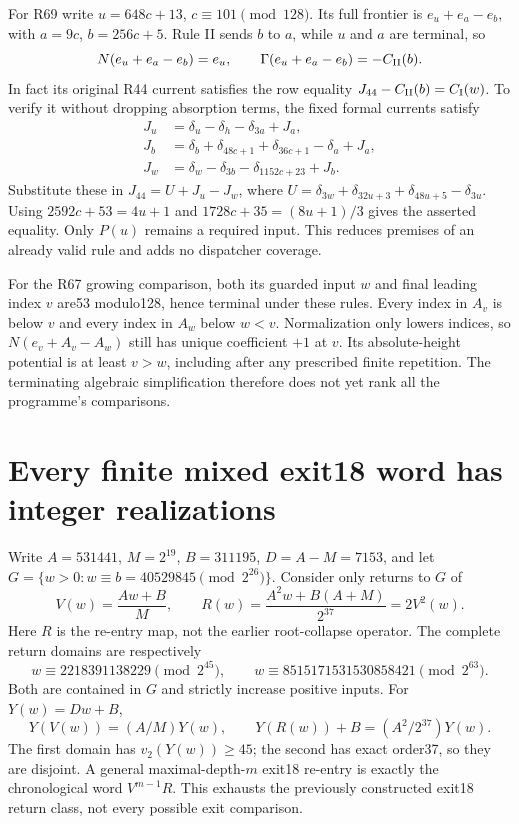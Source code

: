 \documentclass[11pt]{article}
\begin{document}
For R69 write $u=648c+13$, $c\equiv101\pmod{128}$.
Its full frontier is $e_u+e_a-e_b$, with $a=9c$, $b=256c+5$.
Rule II sends $b$ to $a$, while $u$ and $a$ are terminal, so
\[
 N(e_u+e_a-e_b)=e_u,\qquad
 \Gamma(e_u+e_a-e_b)=-C_{\rm II}(b).
\]
In fact its original R44 current satisfies the row equality
$J_{44}-C_{\rm II}(b)=C_{\rm I}(w)$.
To verify it without dropping absorption terms, the fixed formal currents
satisfy
\begin{align*}
 J_u&=\delta_u-\delta_h-\delta_{3a}+J_a,\\
 J_b&=\delta_b+\delta_{48c+1}+\delta_{36c+1}-\delta_a+J_a,\\
 J_w&=\delta_w-\delta_{3b}-\delta_{1152c+23}+J_b.
\end{align*}
Substitute these in $J_{44}=U+J_u-J_w$, where
$U=\delta_{3w}+\delta_{32u+3}+\delta_{48u+5}-\delta_{3u}$.
Using $2592c+53=4u+1$ and $1728c+35=(8u+1)/3$ gives the asserted
equality. Only $P(u)$ remains a required input. This reduces premises
of an already valid rule and adds no dispatcher coverage.

For the R67 growing comparison, both its guarded input $w$ and final
leading index $v$ are53 modulo128, hence terminal under these rules.
Every index in $A_v$ is below $v$ and every index in $A_w$ below $w<v$.
Normalization only lowers indices, so $N(e_v+A_v-A_w)$ still has unique
coefficient $+1$ at $v$. Its absolute-height potential is at least
$v>w$, including after any prescribed finite repetition.
The terminating algebraic simplification therefore does not yet rank
all the programme's comparisons.

\section{Every finite mixed exit18 word has integer realizations}
Write $A=531441$, $M=2^{19}$, $B=311195$, $D=A-M=7153$, and let
$G=\{w>0:w\equiv b=40529845\pmod{2^{26}}\}$.
Consider only returns to $G$ of
\[
 V(w)=\frac{Aw+B}{M},\qquad
 R(w)=\frac{A^2w+B(A+M)}{2^{37}}=2V^2(w).
\]
Here $R$ is the re-entry map, not the earlier root-collapse operator.
The complete return domains are respectively
\[
 w\equiv2218391138229\pmod{2^{45}},\qquad
 w\equiv8515171531530858421\pmod{2^{63}}.
\]
Both are contained in $G$ and strictly increase positive inputs.
For $Y(w)=Dw+B$,
\[
 Y(V(w))=(A/M)Y(w),\qquad
 Y(R(w))+B=(A^2/2^{37})Y(w).
\]
The first domain has $v_2(Y(w))\ge45$; the second has exact order37,
so they are disjoint. A general maximal-depth-$m$ exit18 re-entry is
exactly the chronological word $V^{m-1}R$. This exhausts the previously
constructed exit18 return class, not every possible exit comparison.
\end{document}
